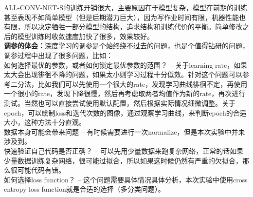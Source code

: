 \documentclass[a4paper,UTF8]{article}
\numberwithin{equation}{section}
\begin{document}
\begin{enumerate}
ALL-CONV-NET-S的训练开销很大，主要原因在于模型复杂，模型在前期的训练甚至表现不如简单模型（但是后期潜力巨大），因为写作业时间有限，机器性能也有限，所以决定牺牲一部分模型的结构，追求结构和训练代价的平衡。简单修改之后的模型训练时收敛速度加快了很多，效果较好。\\
\textbf{调参的体会：}深度学习的调参是个始终绕不过去的问题，也是个值得钻研的问题，调参过程中出现了很多问题，比如：\\
如何选择最优的参数，或者如何锁定最优参数的范围？ -- 关于learning rate，如果太大会出现徘徊不降的问题，如果太小则学习过程十分低效。针对这个问题可以参考二分法，比如我们可以先使用一个很大的rate，发现学习曲线徘徊不定，再使用一个很小的rate，发现下降很慢，然后再考虑取两者均值作为新的rate，再次进行测试。当然也可以直接尝试使用默认配置，然后根据实际情况细微调整。关于epoch，可以绘制loss和迭代次数的图像，通过观察学习曲线，来判断epoch的合适大小，这种方法十分直观。\\
数据本身可能会带来问题 -- 有时候需要进行一次normalize，但是本次实验中并未涉及到。\\
快速验证自己代码是否正确？ -- 可以先用少量数据来跑复杂网络，正常的话如果少量数据训练复杂网络，很可能过拟合，所以如果这时候仍然有严重的欠拟合，那么很可能代码有错。\\
如何选择loss function？ -- 这个问题需要具体情况具体分析，本次实验中使用cross entropy loss function就是合适的选择（多分类问题）。\\


\end{enumerate}
\end{document}
